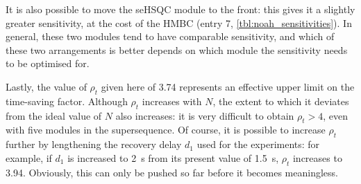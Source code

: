 It is also possible to move the \nitrogen{} seHSQC module to the front: this gives it a slightly greater sensitivity, at the cost of the HMBC (entry 7, \cref{tbl:noah_sensitivities}).
In general, these two modules tend to have comparable sensitivity, and which of these two arrangements is better depends on which module the sensitivity needs to be optimised for.

Lastly, the value of $\rho_t$ given here of 3.74 represents an effective upper limit on the time-saving factor.
Although $\rho_t$ increases with $N$, the extent to which it deviates from the ideal value of $N$ also increases: it is very difficult to obtain $\rho_t > 4$, even with five modules in the supersequence.
Of course, it is possible to increase $\rho_t$ further by lengthening the recovery delay $d_1$ used for the experiments: for example, if $d_1$ is increased to \qty{2}{\s} from its present value of \qty{1.5}{\s}, $\rho_t$ increases to 3.94.
Obviously, this can only be pushed so far before it becomes meaningless.
